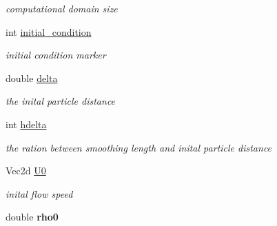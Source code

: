 \begin{CompactItemize}
\begin{CompactList}\small\item\em computational domain size \item\end{CompactList}\item 
\hypertarget{classParticleManager_f91681a876131de64a0e2f6209d9bd89}{
int \hyperlink{classParticleManager_f91681a876131de64a0e2f6209d9bd89}{initial\_\-condition}}
\label{classParticleManager_f91681a876131de64a0e2f6209d9bd89}

\begin{CompactList}\small\item\em initial condition marker \item\end{CompactList}\item 
\hypertarget{classParticleManager_186eaba52a3b1a3ed7f098d1f2a56d9c}{
double \hyperlink{classParticleManager_186eaba52a3b1a3ed7f098d1f2a56d9c}{delta}}
\label{classParticleManager_186eaba52a3b1a3ed7f098d1f2a56d9c}

\begin{CompactList}\small\item\em the inital particle distance \item\end{CompactList}\item 
\hypertarget{classParticleManager_d77df8bc47beefcd049c4277c53d095a}{
int \hyperlink{classParticleManager_d77df8bc47beefcd049c4277c53d095a}{hdelta}}
\label{classParticleManager_d77df8bc47beefcd049c4277c53d095a}

\begin{CompactList}\small\item\em the ration between smoothing length and inital particle distance \item\end{CompactList}\item 
\hypertarget{classParticleManager_cb03c536574d333e0d733158aae652a1}{
Vec2d \hyperlink{classParticleManager_cb03c536574d333e0d733158aae652a1}{U0}}
\label{classParticleManager_cb03c536574d333e0d733158aae652a1}

\begin{CompactList}\small\item\em inital flow speed \item\end{CompactList}\item 
\hypertarget{classParticleManager_f19707700ab5014b13c1f623438d6b2f}{
double \textbf{rho0}}
\label{classParticleManager_f19707700ab5014b13c1f623438d6b2f}


\end{CompactItemize}
